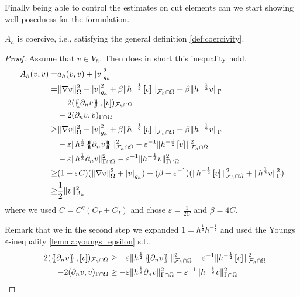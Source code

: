 Finally being able to control the estimates on cut elements can we start showing well-posedness for the formulation.

\begin{lemma}
    $A_{h}$ is coercive, i.e., satisfying the general definition \ref{def:coercivity}.
\end{lemma}
\begin{proof}
    Assume that $v \in V_{h} $. Then does in short this inequality hold,
\[
    \begin{split}
A_{h}( v, v)   =& a_{h}( v, v) + \left\lvert v \right\rvert _{g_{h}}^{2} \\
=&  \| \nabla v \|_{  \Omega }^{ 2 } + \left\lvert v \right\rvert _{ g_{h} }^{ 2 } + \beta \| h^{-\frac{1}{2}} \jump{ v }   \|_{\mathcal{F} _{h} \cap \Omega   }^{  }   + \beta \| h^{-\frac{1}{2}}  v    \|_{ \Gamma}^{  }
\\ & - 2( \mean{ \partial _{n} v  },  \jump{ v })_{\mathcal{F} _{h} \cap \Omega }
\\ & - 2 ( \partial _{n} v,v)_{\Gamma \cap \Omega }     \\
\ge  &  \| \nabla v \|_{  \Omega }^{ 2 } + \left\lvert v \right\rvert_{ g_{h} }^{ 2 } + \beta \| h^{-\frac{1}{2}} \jump{ v }   \|_{\mathcal{F} _{h} \cap \Omega   }^{  }   + \beta \| h^{-\frac{1}{2}}  v    \|_{ \Gamma}^{  }
\\ & - \varepsilon \| h^{\frac{1}{2}}  \mean{  \partial _{n} v}      \|_{ \mathcal{F} _{h} \cap \Omega  }^{2  } - \varepsilon ^{-1} \| h^{-\frac{1}{2}} \jump{ v }   \|_{\mathcal{F} _{h} \cap \Omega   }^{ 2 }
\\ & - \varepsilon \| h^{\frac{1}{2}} \partial _{n} v \|_{ \Gamma \cap \Omega  }^{2  } -  \varepsilon ^{-1} \| h^{-\frac{1}{2}} v \|_{  \Gamma \cap  \Omega }^{ 2 } \\
\ge & ( 1-\varepsilon C)  ( \| \nabla v \|_{\Omega   }^{2  } + \left\lvert v \right\rvert _{g_{h}}   ) + ( \beta - \varepsilon ^{-1} ) ( \| h^{-\frac{1}{2}} \jump{ v }   \|_{ \mathcal{F} _{h}\cap  \Omega  }^{ 2 } + \| h^{\frac{1}{2}} v \|_{\Gamma
}^{  2}  )    \\
\ge & \frac{1}{2} \| v \|_{ A_{h} }^{ 2 }
    \end{split}
\]
where we used $C= C^{g} ( C_{\Gamma } + C_{I}) $ and chose $\varepsilon = \frac{1}{2C}$ and $\beta  = 4C$.

Remark that we in the second step we expanded $ 1 =  h^{\frac{1}{2}} h^{-\frac{1}{2}}$ and used the Youngs $\varepsilon $-inequality \ref{lemma:youngs_epsilon} s.t.,
 \[
     \begin{split}
         - 2( \mean{ \partial _{n} v  },  \jump{ v })_{\mathcal{F} _{h} \cap \Omega } &\ge - \varepsilon \| h^{\frac{1}{2}}  \mean{  \partial _{n} v}      \|_{ \mathcal{F} _{h} \cap \Omega  }^{2  }
  - \varepsilon ^{-1} \| h^{-\frac{1}{2}} \jump{ v }   \|_{\mathcal{F} _{h} \cap \Omega   }^{ 2 } \\
- 2 ( \partial _{n} v,v)_{\Gamma \cap \Omega }   &\ge- \varepsilon \| h^{\frac{1}{2}} \partial _{n} v \|_{ \Gamma \cap \Omega  }^{2  }
-  \varepsilon ^{-1} \| h^{-\frac{1}{2}} v \|_{  \Gamma \cap  \Omega }^{ 2 }
     \end{split}
 \]


\end{proof}
